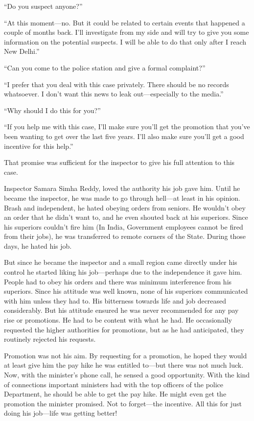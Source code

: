 “Do you suspect anyone?”

“At this moment—no. But it could be related to certain events that happened a
couple of months back. I'll investigate from my side and will try to give you
some information on the potential suspects. I will be able to do that only after
I reach New Delhi.”

“Can you come to the police station and give a formal complaint?”

“I prefer that you deal with this case privately. There should be no records
whatsoever. I don't want this news to leak out—especially to the media.”

“Why should I do this for you?”

“If you help me with this case, I'll make sure you'll get the promotion that
you've been wanting to get over the last five years. I'll also make sure you'll
get a good incentive for this help.”

That promise was sufficient for the inspector to give his full attention to this
case.

Inspector Samara Simha Reddy, loved the authority his job gave him. Until
he became the inspector, he was made to go through hell—at least in his
opinion. Brash and independent, he hated obeying orders from seniors. He
wouldn't obey an order that he didn't want to, and he even shouted back at his
superiors. Since his superiors couldn't fire him (In India, Government employees
cannot be fired from their jobs), he was transferred to remote corners of the
State. During those days, he hated his job.

But since he became the inspector and a small region came directly under his
control he started liking his job—perhaps due to the independence it gave him.
People had to obey his orders and there was minimum interference from his
superiors. Since his attitude was well known, none of his superiors communicated
with him unless they had to. His bitterness towards life and job decreased
considerably. But his attitude ensured he was never recommended for any pay rise
or promotions. He had to be content with what he had. He occasionally requested
the higher authorities for promotions, but as he had anticipated, they routinely
rejected his requests.

Promotion was not his aim. By requesting for a promotion, he hoped they would at
least give him the pay hike he was entitled to—but there was not much luck.
Now, with the minister's phone call, he sensed a good opportunity. With the kind
of connections important ministers had with the top officers of the police
Department, he should be able to get the pay hike. He might even get the
promotion the minister promised. Not to forget—the incentive. All this for
just doing his job—life was getting better!